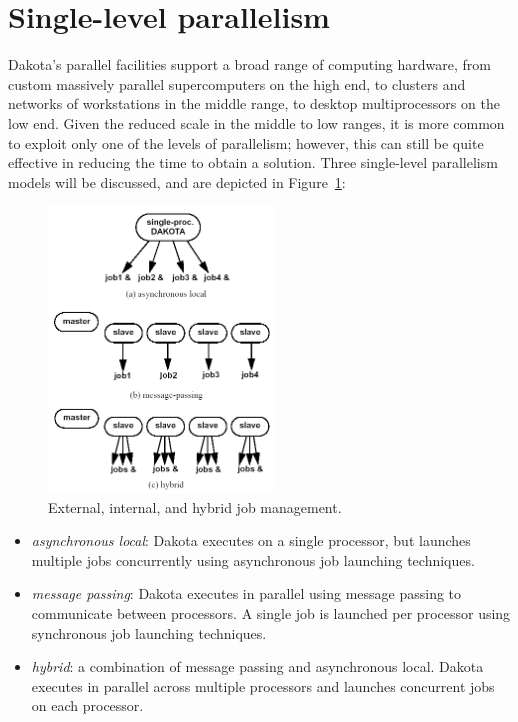 \section{Single-level parallelism} \label{parallel:SLP}


Dakota's parallel facilities support a broad range of computing
hardware, from custom massively parallel supercomputers on the high
end, to clusters and networks of workstations in the middle range, to
desktop multiprocessors on the low end. Given the reduced scale in the
middle to low ranges, it is more common to exploit only one of the
levels of parallelism; however, this can still be quite effective in
reducing the time to obtain a solution.  Three single-level
parallelism models will be discussed, and are depicted in
Figure~\ref{parallel:figure03}:

\begin{figure}[ht]
  \centering
  \includegraphics[width=60mm]{images/ex_in_hy_job_management}
  \caption{External, internal, and hybrid job management.}
  \label{parallel:figure03}
\end{figure}

\begin{itemize}
\item \emph{asynchronous local}: Dakota executes on a single processor,
but launches multiple jobs concurrently using asynchronous job launching
techniques.

\item \emph{message passing}: Dakota executes in parallel using message
passing to communicate between processors.  A single job is launched
per processor using synchronous job launching techniques.

\item \emph{hybrid}: a combination of message passing and asynchronous
local.  Dakota executes in parallel across multiple processors and
launches concurrent jobs on each processor.
\end{itemize}

